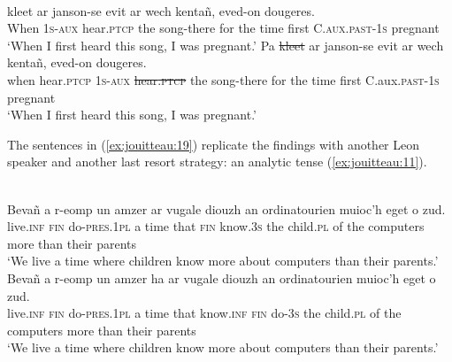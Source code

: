\documentclass[output=paper,colorlinks,citecolor=brown]{langscibook}
\begin{document}
\newpage
\ea \label{ex:jouitteau:18} \\
    \ea \label{ex:jouitteau:18a}
    \gll {}       {}    kleet         ar janson-se     evit  ar  wech kentañ, eved-on         dougeres. \\
     When  \textsc{1s-aux} hear\textsc{.ptcp}  the song-there  for   the time  first      C.\textsc{aux.past}{}-\textsc{1s} pregnant   \\
    \glt `When I first heard this song, I was pregnant.’
    \ex \label{ex:jouitteau:18b}
    \gll Pa              {}  \sout{kleet}       ar janson-se    evit ar wech kentañ, eved-on    dougeres. \\
     when hear\textsc{.ptcp} 1\textsc{s-aux} \sout{hear\textsc{.ptcp}} the song-there  for the time  first     C.aux\textsc{.past}{}-\textsc{1s} pregnant \\
    \glt `When I first heard this song, I was pregnant.’ \\
    \z 
    \z  

The sentences in (\ref{ex:jouitteau:19}) replicate the findings with another Leon speaker and another last resort strategy: an analytic tense (\ref{ex:jouitteau:11}).

\ea \label{ex:jouitteau:19} \\
\ea \label{ex:jouitteau:19a}
    \gll  Bevañ    a    r-eomp        un amzer   {}     {}         ar  vugale  diouzh  an   ordinatourien  muioc'h  eget  o      zud. \\
       live\textsc{.inf}  \textsc{fin} do\textsc{-pres.1pl}  a  time    that  \textsc{fin}  know\textsc{.3s} the child\textsc{.pl}
  of         the  computers       more       than their parents   \\
    \glt   ‘We live a time where children know more about computers than their parents.’
    \ex \label{ex:jouitteau:19b}
    \gll Bevañ    a    r-eomp       un amzer ha        {}     {}     ar  vugale diouzh  an   ordinatourien  muioc'h  eget  o      zud. \\
    live\textsc{.inf}  \textsc{fin} do\textsc{{}-pres.1pl} a  time     that  know\textsc{.inf}  \textsc{fin} do-3\textsc{s} the child\textsc{.pl}   of         the  computers       more       than their parents \\
    \glt ‘We live a time where children know more about computers than their parents.’ 
    \z 
    \z
       
\end{document}
